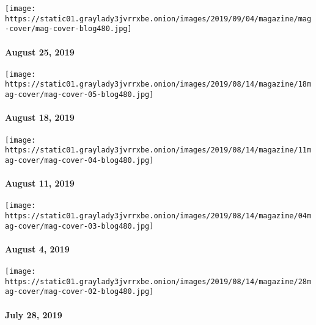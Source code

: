 \href{https://www.nytimes3xbfgragh.onion/issue/magazine/2019/09/04/the-82519-issue}{}

\texttt{[image: https://static01.graylady3jvrrxbe.onion/images/2019/09/04/magazine/mag-cover/mag-cover-blog480.jpg]}

\hypertarget{august-25-2019}{%
\paragraph{August 25, 2019}\label{august-25-2019}}

\href{https://www.nytimes3xbfgragh.onion/interactive/2019/08/14/magazine/1619-america-slavery.html}{}

\texttt{[image: https://static01.graylady3jvrrxbe.onion/images/2019/08/14/magazine/18mag-cover/mag-cover-05-blog480.jpg]}

\hypertarget{august-18-2019}{%
\paragraph{August 18, 2019}\label{august-18-2019}}

\href{https://www.nytimes3xbfgragh.onion/issue/magazine/2019/08/14/the-81119-issue}{}

\texttt{[image: https://static01.graylady3jvrrxbe.onion/images/2019/08/14/magazine/11mag-cover/mag-cover-04-blog480.jpg]}

\hypertarget{august-11-2019}{%
\paragraph{August 11, 2019}\label{august-11-2019}}

\href{https://www.nytimes3xbfgragh.onion/issue/magazine/2019/08/14/the-8419-issue}{}

\texttt{[image: https://static01.graylady3jvrrxbe.onion/images/2019/08/14/magazine/04mag-cover/mag-cover-03-blog480.jpg]}

\hypertarget{august-4-2019}{%
\paragraph{August 4, 2019}\label{august-4-2019}}

\href{https://www.nytimes3xbfgragh.onion/issue/magazine/2019/08/14/the-72819-issue}{}

\texttt{[image: https://static01.graylady3jvrrxbe.onion/images/2019/08/14/magazine/28mag-cover/mag-cover-02-blog480.jpg]}

\hypertarget{july-28-2019}{%
\paragraph{July 28, 2019}\label{july-28-2019}}

